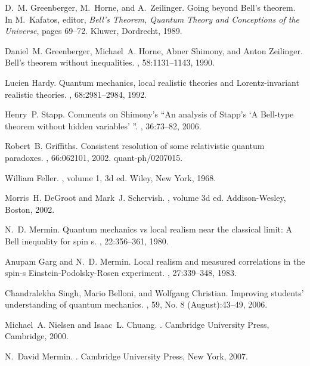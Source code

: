 \documentclass[12pt]{article} %
\begin{document}
\begin{thebibliography}{10}
D.~M. Greenberger, M.~Horne, and A.~Zeilinger.
\newblock Going beyond {B}ell's theorem.
\newblock In M.~Kafatos, editor, {\em Bell's Theorem, Quantum Theory and
  Conceptions of the Universe}, pages 69--72. Kluwer, Dordrecht, 1989.

Daniel~M. Greenberger, Michael~A. Horne, Abner Shimony, and Anton Zeilinger.
\newblock Bell's theorem without inequalities.
, 58:1131--1143, 1990.

Lucien Hardy.
\newblock Quantum mechanics, local realistic theories and {L}orentz-invariant
  realistic theories.
, 68:2981--2984, 1992.

Henry~P. Stapp.
\newblock Comments on {S}himony's ``{A}n analysis of {S}tapp's `{A} {B}ell-type
  theorem without hidden variables' ''.
, 36:73--82, 2006.

Robert~B. Griffiths.
\newblock Consistent resolution of some relativistic quantum paradoxes.
, 66:062101, 2002.
\newblock quant-ph/0207015.

William Feller.
,
  volume 1, 3d ed.
\newblock Wiley, New York, 1968.

Morris~H. DeGroot and Mark~J. Schervish.
, volume 3d ed.
\newblock Addison-Wesley, Boston, 2002.

N.~D. Mermin.
\newblock Quantum mechanics vs local realism near the classical limit: {A}
  {B}ell inequality for spin s.
, 22:356--361, 1980.

Anupam Garg and N.~D. Mermin.
\newblock Local realism and measured correlations in the spin-s
  {E}instein-{P}odolsky-{R}osen experiment.
, 27:339--348, 1983.

Chandralekha Singh, Mario Belloni, and Wolfgang Christian.
\newblock Improving students' understanding of quantum mechanics.
, 59, No. 8 (August):43--49, 2006.

Michael~A. Nielsen and Isaac~L. Chuang.
.
\newblock Cambridge University Press, Cambridge, 2000.

N.~David Mermin.
.
\newblock Cambridge University Press, New York, 2007.


\end{thebibliography}
\end{document}
